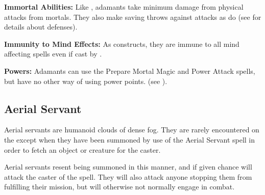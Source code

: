 \begin{multicols*}{2}
\textbf{Immortal Abilities:} Like , adamants take minimum damage from physical attacks from mortals. They also make saving throws against attacks as  do (see  for details about  defenses).

\textbf{Immunity to Mind Effects:} As constructs, they are immune to all mind affecting spells even if cast by .

\textbf{Powers:} Adamants can use the Prepare Mortal Magic and Power Attack spells, but have no other way of using power points. (see ).

\subsection{Aerial Servant}\label{monster:Aerial Servant}

Aerial servants are humanoid clouds of dense fog. They are rarely encountered on the  except when they have been summoned by use of the Aerial Servant spell in order to fetch an object or creature for the caster.

Aerial servants resent being summoned in this manner, and if given chance will attack the caster of the spell. They will also attack anyone stopping them from fulfilling their mission, but will otherwise not normally engage in combat.


\end{multicols*}
